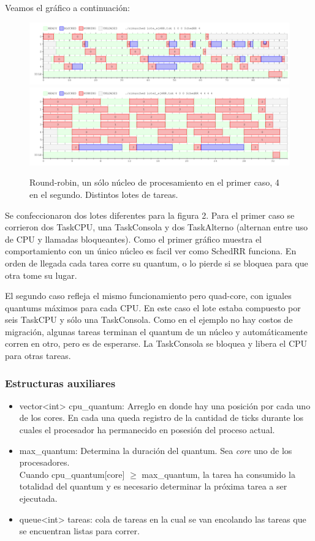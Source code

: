 Veamos el gráfico a continuación:

\begin{figure}[H]
\centering\includegraphics[width=15 cm]{graficos/ej4RR1.png}
\centering\includegraphics[width=15 cm]{graficos/ej4RR2.png}
\caption{Round-robin, un sólo núcleo de procesamiento en el primer caso, 4 en el segundo. Distintos lotes de tareas.}
\end{figure}

Se confeccionaron dos lotes diferentes para la figura 2. Para el primer caso se corrieron dos TaskCPU, una TaskConsola y dos TaskAlterno (alternan entre uso de CPU y llamadas bloqueantes). Como el primer gráfico muestra el comportamiento con un único núcleo es facil ver como SchedRR funciona. En orden de llegada cada tarea corre su quantum, o lo pierde si se bloquea para que otra tome su lugar.

El segundo caso refleja el mismo funcionamiento pero quad-core, con iguales quantums máximos para cada CPU. En este caso el lote estaba compuesto por seis TaskCPU y sólo una TaskConsola. Como en el ejemplo no hay costos de migración, algunas tareas terminan el quantum de un núcleo y automáticamente corren en otro, pero es de esperarse. La TaskConsola se bloquea y libera el CPU para otras tareas.

\subsubsection{Estructuras auxiliares}

\begin{itemize}
  \item vector<int> cpu\_quantum: Arreglo en donde hay una posición por cada uno de los cores. En cada una queda registro de la cantidad de ticks durante los cuales el procesador ha permanecido
  en posesión del proceso actual. 
  \item max\_quantum: Determina la duración del quantum. Sea \emph{core} uno de los procesadores.\\ 
  Cuando cpu\_quantum[core] $\geq$ max\_quantum, la tarea ha consumido la totalidad del quantum y es necesario determinar la próxima tarea a ser ejecutada.
  \item queue<int> tareas: cola de tareas en la cual se van encolando las tareas que se encuentran listas para correr.
\end{itemize}

